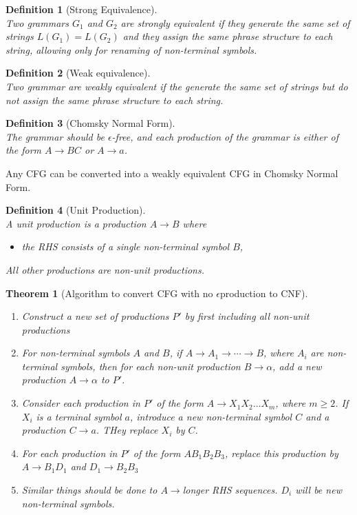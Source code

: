 \documentclass[12pt]{article}
\newtheorem{definition}{Definition}[section]
\newtheorem{theorem}{Theorem}[section]
\theoremstyle{definition}
\begin{document}
\begin{definition}[Strong Equivalence]
\hfill\\\normalfont Two grammars $G_1$ and $G_2$ are strongly equivalent if they generate the same set of strings $L(G_1) = L(G_2)$ and they assign the same phrase structure to each string, allowing only for renaming of non-terminal symbols.
\end{definition}
\begin{definition}[Weak equivalence]
\hfill\\\normalfont Two grammar are weakly equivalent if the generate the same set of strings but do not assign the same phrase structure to each string.
\end{definition}
\begin{definition}[Chomsky Normal Form]
\hfill\\\normalfont The grammar should be $\epsilon$-free, and each production of the grammar is either of the form $A\to BC$ or $A\to a$.
\end{definition}
Any CFG can be converted into a weakly equivalent CFG in Chomsky Normal Form.\\
\begin{definition}[Unit Production]
\hfill\\\normalfont A unit production is a production $A\to B$ where 
\begin{itemize}
	\item the RHS consists of a single non-terminal symbol $B$,
\end{itemize}
All other productions are non-unit productions.
\end{definition}
\begin{theorem}[Algorithm to convert CFG with no {$\epsilon$}production to CNF]
\hfill\\\normalfont
\begin{enumerate}
	\item Construct a new set of productions $P'$ by first including all non-unit productions
	\item For non-terminal symbols $A$ and $B$, if $A\to A_1\to \cdots \to B$, where $A_i$ are non-terminal symbols, then for each non-unit production $B\to\alpha$, add a new production $A\to \alpha$ to $P'$.
	\item Consider each production in $P'$ of the form $A\to X_1X_2\ldots X_m$, where $m\geq 2$. If $X_i$ is a terminal symbol $a$, introduce a new non-terminal symbol $C$ and a production $C\to a$. THey replace $X_i$ by $C$.
	\item For each production in $P'$ of the form $A B_1B_2B_3$, replace this production by $A\to B_1D_1$ and $D_1\to B_2B_3$
	\item Similar things should be done to $A\to $longer RHS sequences. $D_i$ will be new non-terminal symbols.
\end{enumerate}
\end{theorem}
\end{document}
